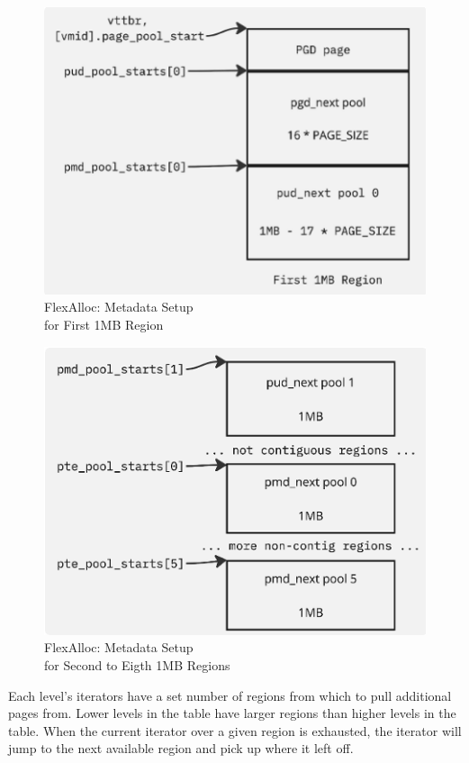 \begin{figure}[h!tbp]
\centering
\captionsetup{justification=centering}
\includegraphics{firstmbregion}
\caption{FlexAlloc: Metadata Setup\\for First 1MB Region}
\label{fig:firstmbregion}
\end{figure}

\begin{figure}[h!tbp]
\centering
\captionsetup{justification=centering}
\includegraphics{otherregions}
\caption{FlexAlloc: Metadata Setup\\for Second to Eigth 1MB Regions}
\label{fig:otherregions}
\end{figure}

\bigskip Each level's iterators have a set number of regions from which to pull additional pages from. Lower
levels in the table have larger regions than higher levels in the table. When the current iterator
over a given region is exhausted, the iterator will jump to the next available region and pick up
where it left off.


